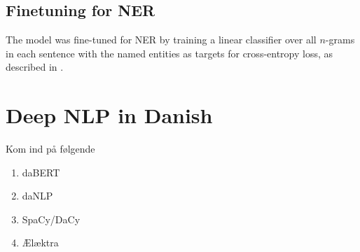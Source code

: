 \documentclass[main.tex]{subfiles}
\begin{document}
\subsection{Finetuning for NER}
The model was fine-tuned for NER by training a linear classifier over all $n$-grams in each sentence with the named entities as targets for cross-entropy loss, as described in \cite[Sec. 4.3]{yamada2020luke}.

\section{Deep NLP in Danish}

Kom ind på følgende
\begin{enumerate}
    \item daBERT
    \item daNLP
    \item SpaCy/DaCy
    \item Ælæktra
\end{enumerate}
\end{document}
